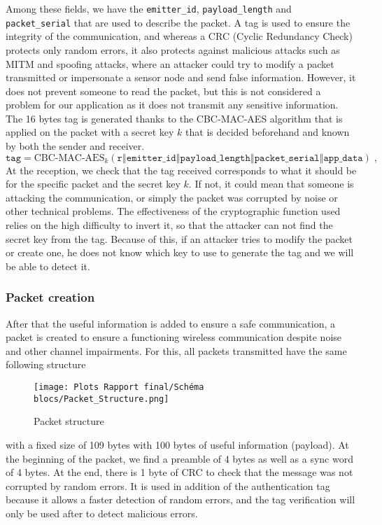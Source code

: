 \documentclass{article}
\begin{document}
Among these fields, we have the \texttt{emitter\_id}, \texttt{payload\_length} and \texttt{packet\_serial} that are used to describe the packet. A tag is used to ensure the integrity of the communication, and whereas a CRC (Cyclic Redundancy Check) protects only random errors, it also protects against malicious attacks such as MITM and spoofing attacks, where an attacker could try to modify a packet transmitted or impersonate a sensor node and send false information. However, it does not prevent someone to read the packet, but this is not considered a problem for our application as it does not transmit any sensitive information. 
The 16 bytes tag is generated thanks to the CBC-MAC-AES algorithm that is applied on the packet with a secret key $k$ that is decided beforehand and known by both the sender and receiver. 
\[
    \texttt{tag} = \text{CBC-MAC-AES}_{k}\left(
        \texttt{r$\mathbin\Vert$emitter\_id$\mathbin\Vert$payload\_length$\mathbin\Vert$packet\_serial$\mathbin\Vert$app\_data}
    \right)\;,
\]
At the reception, we check that the tag received corresponds to what it should be for the specific packet and the secret key $k$. If not, it could mean that someone is attacking the communication, or simply the packet was corrupted by noise or other technical problems. The effectiveness of the cryptographic function used relies on the high difficulty to invert it, so that the attacker can not find the secret key from the tag. Because of this, if an attacker tries to modify the packet or create one, he does not know which key to use to generate the tag and we will be able to detect it.

\subsubsection{Packet creation}

After that the useful information is added to ensure a safe communication, a packet is created to ensure a functioning wireless communication despite noise and other channel impairments. For this, all packets transmitted have the same following structure 

\begin{figure}[H]  %
    \centering
    \texttt{[image: Plots Rapport final/Schéma blocs/Packet\_Structure.png]}
    \caption{Packet structure}
    \label{fig:enter-label}
\end{figure}

with a fixed size of 109 bytes with 100 bytes of useful information (payload). At the beginning of the packet, we find a preamble of 4 bytes as well as a sync word of 4 bytes. At the end, there is 1 byte of CRC to check that the message was not corrupted by random errors. It is used in addition of the authentication tag because it allows a faster detection of random errors, and the tag verification will only be used after to detect malicious errors. \\
\end{document}
